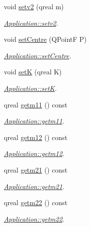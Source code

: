 \begin{DoxyCompactItemize}
void \hyperlink{class_application_af32de2ec7844f1ff7100fe6754342b82}{setv2} (qreal m)
\begin{DoxyCompactList}\small\item\em \hyperlink{class_application_af32de2ec7844f1ff7100fe6754342b82}{Application\+::setv2}. \end{DoxyCompactList}\item 
void \hyperlink{class_application_af7b5cc5fd1fdd281c01a935107fb10cf}{set\+Centre} (Q\+Point\+F P)
\begin{DoxyCompactList}\small\item\em \hyperlink{class_application_af7b5cc5fd1fdd281c01a935107fb10cf}{Application\+::set\+Centre}. \end{DoxyCompactList}\item 
void \hyperlink{class_application_ad8c25e9e1bf6f4c74edf37f05ee8cf2b}{set\+K} (qreal K)
\begin{DoxyCompactList}\small\item\em \hyperlink{class_application_ad8c25e9e1bf6f4c74edf37f05ee8cf2b}{Application\+::set\+K}. \end{DoxyCompactList}\item 
qreal \hyperlink{class_application_a357858613a73ea5d6a2010c8cab55659}{getm11} () const 
\begin{DoxyCompactList}\small\item\em \hyperlink{class_application_a357858613a73ea5d6a2010c8cab55659}{Application\+::getm11}. \end{DoxyCompactList}\item 
qreal \hyperlink{class_application_afc7c55158f56d426f4aac1eef1496a24}{getm12} () const 
\begin{DoxyCompactList}\small\item\em \hyperlink{class_application_afc7c55158f56d426f4aac1eef1496a24}{Application\+::getm12}. \end{DoxyCompactList}\item 
qreal \hyperlink{class_application_a65f04fc0bf4c630797a07800ccd9730c}{getm21} () const 
\begin{DoxyCompactList}\small\item\em \hyperlink{class_application_a65f04fc0bf4c630797a07800ccd9730c}{Application\+::getm21}. \end{DoxyCompactList}\item 
qreal \hyperlink{class_application_a67274b1d5d6a270245154cfbce5ae160}{getm22} () const 
\begin{DoxyCompactList}\small\item\em \hyperlink{class_application_a67274b1d5d6a270245154cfbce5ae160}{Application\+::getm22}. \end{DoxyCompactList}\item 

\end{DoxyCompactItemize}
